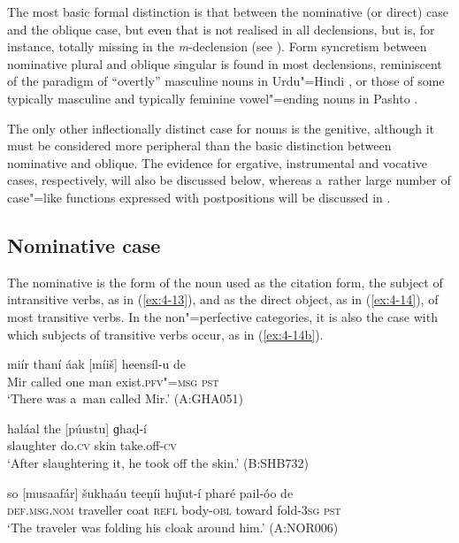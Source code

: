 The most basic formal distinction is that between the nominative (or direct) case and the oblique case, but even that is not realised in all declensions, but is, for instance, totally missing in the \textit{m}-declension (see ). Form syncretism \citep[27]{matthews1991} between nominative plural and oblique singular is found in most declensions, reminiscent of the paradigm of ``overtly'' masculine nouns in Urdu"=Hindi \citep[1]{schmidt1999}, or those of some typically masculine and typically feminine vowel"=ending nouns in Pashto \citep[726-728]{robsontegey2009}.


The only other inflectionally distinct case for nouns is the genitive, although it must be considered more peripheral than the basic distinction between nominative and oblique. The evidence for ergative, instrumental and vocative cases, respectively, will also be discussed below, whereas a~rather large number of case"=like functions expressed with postpositions will be discussed in .


\subsection{Nominative case}
\label{subsec:4-5-1}

The nominative is the form of the noun used as the citation form, the subject of intransitive verbs, as in (\ref{ex:4-13}), and as the direct object, as in (\ref{ex:4-14}), of most transitive verbs. In the non"=perfective categories, it is also the case with which subjects of transitive verbs occur, as in (\ref{ex:4-14b}). 


\begin{exe}
\ex
\label{ex:4-13}
\gll miír thaní áak [míiš] heensíl-u de\\
	Mir called one man exist.\textsc{pfv"=msg} \textsc{pst}\\
\glt `There was a~man called Mir.' (A:GHA051)
\end{exe}

\begin{exe}
\ex
\label{ex:4-14}
\gll haláal the [púustu] ɡhaḍ-í \\
	slaughter do.\textsc{cv} skin take.off-\textsc{cv} \\
\glt `After slaughtering it, he took off the skin.' (B:SHB732)
\end{exe}

\begin{exe}
\ex
\label{ex:4-14b}
\gll so [musaafár] šukhaáu teeṇíi huǰut-í pharé pail-óo de \\
	\textsc{def.msg.nom} traveller coat \textsc{refl} body-\textsc{obl} toward fold-\textsc{3sg} \textsc{pst} \\
\glt `The traveler was folding his cloak around him.' (A:NOR006)
\end{exe}


